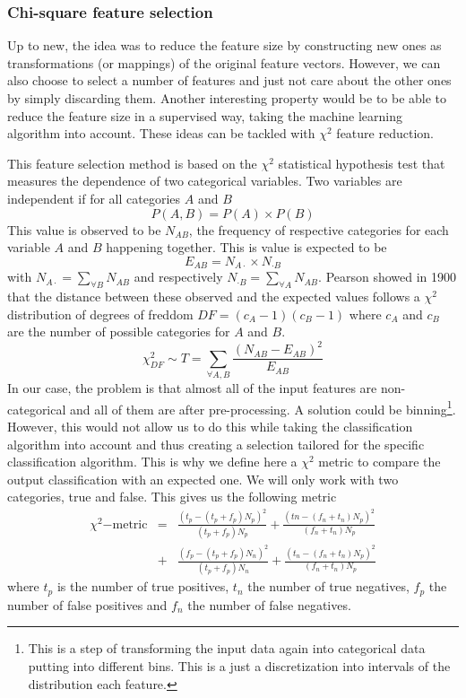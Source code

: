 \subsubsection{Chi-square feature selection}
Up to new, the idea was to reduce the feature size by constructing new ones as transformations (or mappings) of the original feature vectors. However, we can also choose to select a number of features and just not care about the other ones by simply discarding them. Another interesting property would be to be able to reduce the feature size in a supervised way, taking the machine learning algorithm into account. These ideas can be tackled with $\chi^2$ feature reduction.

This feature selection method is based on the $\chi^2$ statistical hypothesis test that measures the dependence of two categorical variables. Two variables are independent if for all categories $A$ and $B$
\begin{equation}
    P(A, B) = P(A) \times P(B)
\end{equation}
This value is observed to be $N_{AB}$, the frequency of respective categories for each variable $A$ and $B$ happening together. This is value is expected to be
\begin{equation}
    E_{AB} = N_{A\cdot} \times N_{\cdot B}
\end{equation}
with $N_{A\cdot} = \sum_{\forall B} N_{AB}$ and respectively $N_{\cdot B} = \sum_{\forall A} N_{AB}$. Pearson showed in 1900 that the distance between these observed and the expected values follows a $\chi^2$ distribution of degrees of freddom $DF = (c_A-1)(c_B-1)$ where $c_A$ and $c_B$ are the number of possible categories for $A$ and $B$.
\begin{equation}
    \chi^2_{DF} \sim T = \sum_{\forall A,B} \frac{\left(N_{AB}-E_{AB}\right)^2}{E_{AB}}
\end{equation}
In our case, the problem is that almost all of the input features are non-categorical and all of them are after pre-processing. A solution could be binning\footnote{This is a step of transforming the input data again into categorical data putting into different bins. This is a just a discretization into intervals of the distribution each feature.}. However, this would not allow us to do this while taking the classification algorithm into account and thus creating a selection tailored for the specific classification algorithm. This is why we define here a $\chi^2$ metric to compare the output classification with an expected one. We will only work with two categories, true and false. This gives us the following metric
\begin{eqnarray}
    \chi^2\mathrm{-metric} &=& \frac{\left(t_p - (t_p+f_p)N_p \right)^2}{(t_p+f_p)N_p} + \frac{\left(tn - (f_n+t_n)N_p \right)^2}{(f_n+t_n)N_p} \\
    &+& \frac{\left(f_p - (t_p+f_p)N_n \right)^2}{ (t_p+f_p)N_n} + \frac{\left(t_n-(f_n+t_n)N_p \right)^2}{(f_n+t_n)N_p}
\end{eqnarray}
where $t_p$ is the number of true positives, $t_n$ the number of true negatives, $f_p$ the number of false positives and $f_n$ the number of false negatives.

